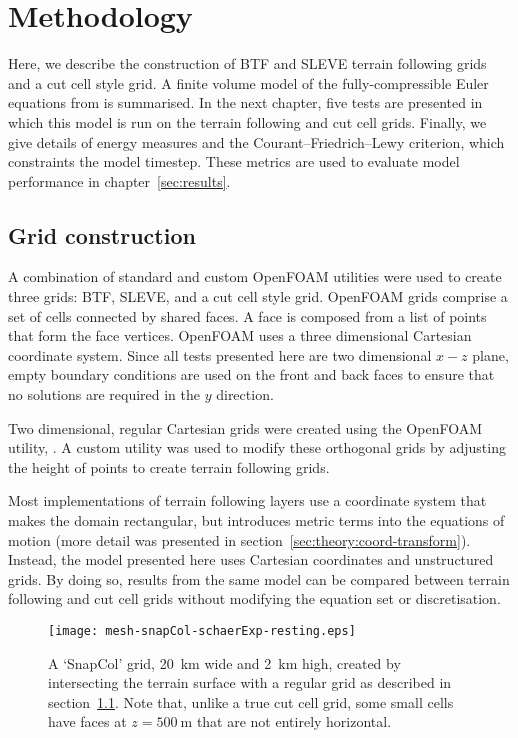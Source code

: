 \chapter{Methodology}
\label{sec:method}

Here, we describe the construction of BTF and SLEVE terrain following grids and a cut cell style grid.  A finite volume model of the fully-compressible Euler equations from \textcite{weller-shahrokhi2014} is summarised.  In the next chapter, five tests are presented in which this model is run on the terrain following and cut cell grids.  Finally, we give details of energy measures and the Courant--Friedrich--Lewy criterion, which constraints the model timestep.  These metrics are used to evaluate model performance in chapter~\ref{sec:results}.

\section{Grid construction}
\label{sec:method:grid}

A combination of standard and custom OpenFOAM utilities were used to create three grids: BTF, SLEVE, and a cut cell style grid.  OpenFOAM grids comprise a set of cells connected by shared faces.  A face is composed from a list of points that form the face vertices.
OpenFOAM uses a three dimensional Cartesian coordinate system.  Since all tests presented here are two dimensional $x-z$ plane, empty boundary conditions are used on the front and back faces to ensure that no solutions are required in the $y$ direction.

Two dimensional, regular Cartesian grids were created using the OpenFOAM utility, .  A custom utility was used to modify these orthogonal grids by adjusting the height of points to create terrain following grids.

Most implementations of terrain following layers use a coordinate system that makes the domain rectangular, but introduces metric terms into the equations of motion (more detail was presented in section~\ref{sec:theory:coord-transform}).  Instead, the model presented here uses Cartesian coordinates and unstructured grids.  By doing so, results from the same model can be compared between terrain following and cut cell grids without modifying the equation set or discretisation.

\begin{figure}
\centerfloat
\texttt{[image: mesh-snapCol-schaerExp-resting.eps]}
\caption{A `SnapCol' grid, \SI{20}{\kilo\meter} wide and \SI{2}{\kilo\meter} high, created by intersecting the terrain surface with a regular grid as described in section~\ref{sec:method:grid}.  Note that, unlike a true cut cell grid, some small cells have faces at $z = \SI{500}{\meter}$ that are not entirely horizontal.}
\label{fig:method:cut-cell}
\end{figure}

